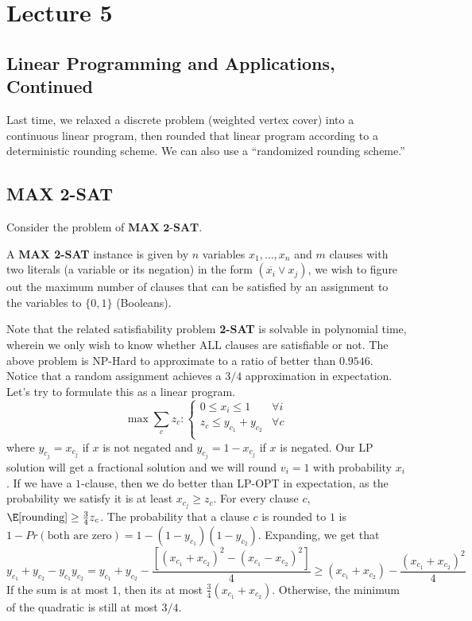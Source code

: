 \section{Lecture 5}
\subsection{Linear Programming and Applications, Continued}
Last time, we relaxed a discrete problem (weighted vertex cover) into a continuous linear program,
then rounded that linear program according to a deterministic rounding scheme.
We can also use a ``randomized rounding scheme.'' 

\subsection{MAX 2-SAT}
Consider the problem of $\textbf{MAX 2-SAT}$.
\begin{definition}
    A \textbf{MAX 2-SAT} instance is given by $n$ variables $x_1, \dots, x_n$
    and $m$ clauses with two literals (a variable or its negation) in the form $(\overline{x_i} \lor x_j)$,
    we wish to figure out the maximum number of clauses that can be
    satisfied by an assignment to the variables to $\{0, 1\}$ (Booleans).
\end{definition}
Note that the related satisfiability problem \textbf{2-SAT} is solvable in polynomial time,
wherein we only wish to know whether ALL clauses are satisfiable or not. The above problem is NP-Hard
to approximate to a ratio of better than $0.9546$. Notice that a random
assignment achieves a $3/4$ approximation in expectation. Let's try to formulate this as a linear program.
\[ \max \sum_c z_c : \begin{cases}
    0 \le x_i \le 1 & \forall i \\
    z_c \le y_{c_1} + y_{c_2} & \forall c \\
\end{cases} \]
where $y_{c_j} = x_{c_j}$ if $x$ is not negated and $y_{c_j} = 1 - x_{c_j}$ if $x$ is negated.
Our LP solution will get a fractional solution and we will round $v_i = 1$ with probability $x_i$.
If we have a $1$-clause, then we do better than LP-OPT in expectation,
as the probability we satisfy it is at least $x_{c_j} \ge z_c$.
For every clause $c$, $\E[\text{rounding}] \ge \frac{3}{4} z_c$.
The probability that a clause $c$ is rounded to $1$ is $1 - Pr(\text{both are zero}) = 1 - (1 - y_{c_1})(1 - y_{c_2})$.
Expanding, we get that 
\[ y_{c_1} + y_{c_2} - y_{c_1} y_{c_2} = y_{c_1} + y_{c_2} - \frac{[(x_{c_1} + x_{c_2})^2 - (x_{c_1} - x_{c_2})^2]}{4} \ge (x_{c_1} + x_{c_2}) - \frac{(x_{c_1} + x_{c_2})^2}{4}\]
If the sum is at most $1$, then its at most $ \frac{3}{4} (x_{c_1} + x_{c_2}) $. Otherwise, the minimum of the quadratic is still at most $3/4$.

